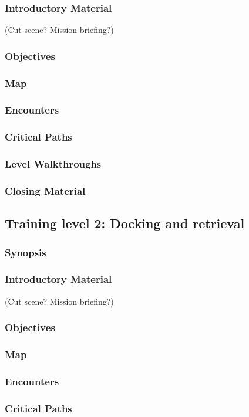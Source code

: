 \subsubsection{Introductory Material}
 (Cut scene?  Mission briefing?)
\subsubsection{Objectives}
\subsubsection{Map}
\subsubsection{Encounters}
\subsubsection{Critical Paths}
\subsubsection{Level Walkthroughs}
\subsubsection{Closing Material}

\subsection{Training level 2: Docking and retrieval}
\subsubsection{Synopsis}
\subsubsection{Introductory Material}
 (Cut scene?  Mission briefing?)
\subsubsection{Objectives}
\subsubsection{Map}
\subsubsection{Encounters}
\subsubsection{Critical Paths}
